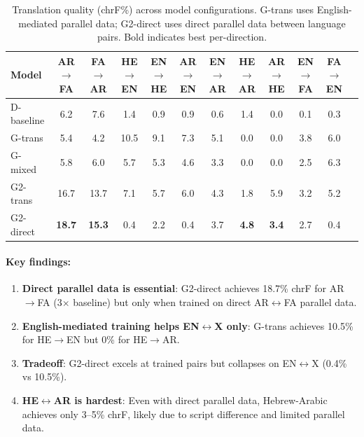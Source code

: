 \documentclass[10pt,twocolumn]{article}
\begin{document}
\begin{table}[t]
\centering\small
\begin{tabular}{lccccccccccc}
\toprule
\textbf{Model} & \textbf{AR$\rightarrow$FA} & \textbf{FA$\rightarrow$AR} & \textbf{HE$\rightarrow$EN} & \textbf{EN$\rightarrow$HE} & \textbf{AR$\rightarrow$EN} & \textbf{EN$\rightarrow$AR} & \textbf{HE$\rightarrow$AR} & \textbf{AR$\rightarrow$HE} & \textbf{EN$\rightarrow$FA} & \textbf{FA$\rightarrow$EN} \\
\midrule
D-baseline & 6.2 & 7.6 & 1.4 & 0.9 & 0.9 & 0.6 & 1.4 & 0.0 & 0.1 & 0.3 \\
G-trans & 5.4 & 4.2 & 10.5 & 9.1 & 7.3 & 5.1 & 0.0 & 0.0 & 3.8 & 6.0 \\
G-mixed & 5.8 & 6.0 & 5.7 & 5.3 & 4.6 & 3.3 & 0.0 & 0.0 & 2.5 & 6.3 \\
G2-trans & 16.7 & 13.7 & 7.1 & 5.7 & 6.0 & 4.3 & 1.8 & 5.9 & 3.2 & 5.2 \\
G2-direct & \textbf{18.7} & \textbf{15.3} & 0.4 & 2.2 & 0.4 & 3.7 & \textbf{4.8} & \textbf{3.4} & 2.7 & 0.4 \\
\bottomrule
\end{tabular}
\caption{Translation quality (chrF\%) across model configurations. G-trans uses English-mediated parallel data; G2-direct uses direct parallel data between language pairs. Bold indicates best per-direction.}
\label{tab:translation}
\end{table}

\paragraph{Key findings:}
\begin{enumerate}
    \item \textbf{Direct parallel data is essential}: G2-direct achieves 18.7\% chrF for AR$\rightarrow$FA (3$\times$ baseline) but only when trained on direct AR$\leftrightarrow$FA parallel data.
    \item \textbf{English-mediated training helps EN$\leftrightarrow$X only}: G-trans achieves 10.5\% for HE$\rightarrow$EN but 0\% for HE$\rightarrow$AR.
    \item \textbf{Tradeoff}: G2-direct excels at trained pairs but collapses on EN$\leftrightarrow$X (0.4\% vs 10.5\%).
    \item \textbf{HE$\leftrightarrow$AR is hardest}: Even with direct parallel data, Hebrew-Arabic achieves only 3--5\% chrF, likely due to script difference and limited parallel data.
\end{enumerate}
\end{document}
